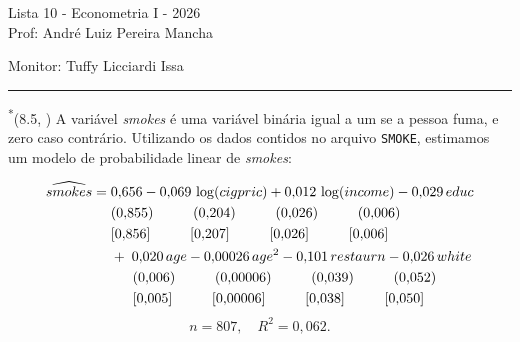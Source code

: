 \documentclass[12pt,letterpaper, onecolumn]{exam}
\begin{document}
\begingroup
    \centering
    \LARGE Lista 10 - Econometria I - 2026\\[0.5em]
    \large Prof: André Luiz Pereira Mancha \par
    \large Monitor: Tuffy Licciardi Issa \par
\endgroup
\rule{\textwidth}{0.4pt}
\pointsdroppedatright
\printanswers
\renewcommand{\solutiontitle}{\noindent\textbf{Ans:}\enspace}
\newcommand{\qstar}{\hspace{-0.6em}\textsuperscript{*}\hspace{0.2em}}

\begin{questions}

\question\qstar (8.5, \citep{wooldridge2016}) A variável \textit{smokes} é uma variável binária igual a um se a pessoa fuma, e zero caso contrário. Utilizando os dados contidos no arquivo \texttt{SMOKE}, estimamos um modelo de probabilidade linear de \textit{smokes}:

\[
\begin{aligned}
\widehat{smokes} =\;& 0{,}656 - 0{,}069\,\log(cigpric) + 0{,}012\,\log(income) - 0{,}029\,educ \\
& (0{,}855)\hspace{1.0cm}(0{,}204)\hspace{1.0cm}(0{,}026)\hspace{1.0cm}(0{,}006) \\
& [0{,}856]\hspace{1.0cm}[0{,}207]\hspace{1.0cm}[0{,}026]\hspace{1.0cm}[0{,}006] \\
& +\; 0{,}020\,age - 0{,}00026\,age^2 - 0{,}101\,restaurn - 0{,}026\,white \\
& \hspace{0.55cm}(0{,}006)\hspace{1.0cm}(0{,}00006)\hspace{1.0cm}(0{,}039)\hspace{1.0cm}(0{,}052) \\
& \hspace{0.55cm}[0{,}005]\hspace{1.0cm}[0{,}00006]\hspace{1.0cm}[0{,}038]\hspace{1.0cm}[0{,}050]
\end{aligned}
\]
\[
n = 807,\quad R^2 = 0{,}062.
\]


\end{questions}
\end{document}

